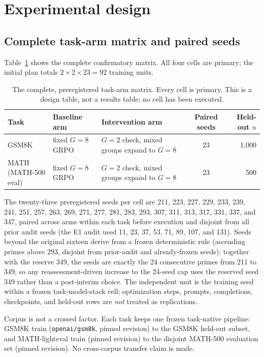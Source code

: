 \documentclass[11pt]{article}
\begin{document}
\section{Experimental design}
\label{sec:design}

\subsection{Complete task-arm matrix and paired seeds}

Table~\ref{tab:matrix} shows the complete confirmatory matrix. All four cells are primary; the initial plan totals $2 \times 2 \times 23 = 92$ training units.

\begin{table}[t]
\centering
\caption{The complete, preregistered task-arm matrix. Every cell is primary. This is a design table, not a results table; no cell has been executed.}
\label{tab:matrix}
\small
\begin{tabular}{@{}llp{5.2cm}cr@{}}
\toprule
Task & Baseline arm & Intervention arm & Paired seeds & Held-out $n$ \\
\midrule
GSM8K   & fixed $G{=}8$ GRPO & $G{=}2$ check, mixed groups expand to $G{=}8$ & 23 & 1{,}000 \\
\shortstack[l]{MATH\\(MATH-500 eval)} & fixed $G{=}8$ GRPO & $G{=}2$ check, mixed groups expand to $G{=}8$ & 23 & 500 \\
\bottomrule
\end{tabular}
\end{table}

The twenty-three preregistered seeds per cell are 211, 223, 227, 229, 233, 239, 241, 251, 257, 263, 269, 271, 277, 281, 283, 293, 307, 311, 313, 317, 331, 337, and 347, paired across arms within each task before execution and disjoint from all prior audit seeds (the E1 audit used 11, 23, 37, 53, 71, 89, 107, and 131). Seeds beyond the original sixteen derive from a frozen deterministic rule (ascending primes above 293, disjoint from prior-audit and already-frozen seeds); together with the reserve 349, the seeds are exactly the 24 consecutive primes from 211 to 349, so any reassessment-driven increase to the 24-seed cap uses the reserved seed 349 rather than a post-interim choice. The independent unit is the training seed within a frozen task-model-stack cell; optimization steps, prompts, completions, checkpoints, and held-out rows are \emph{not} treated as replications.

Corpus is not a crossed factor. Each task keeps one frozen task-native pipeline: GSM8K train (\texttt{openai/gsm8k}, pinned revision) to the GSM8K held-out subset, and MATH-lighteval train (pinned revision) to the disjoint MATH-500 evaluation set (pinned revision). No cross-corpus transfer claim is made.
\end{document}
